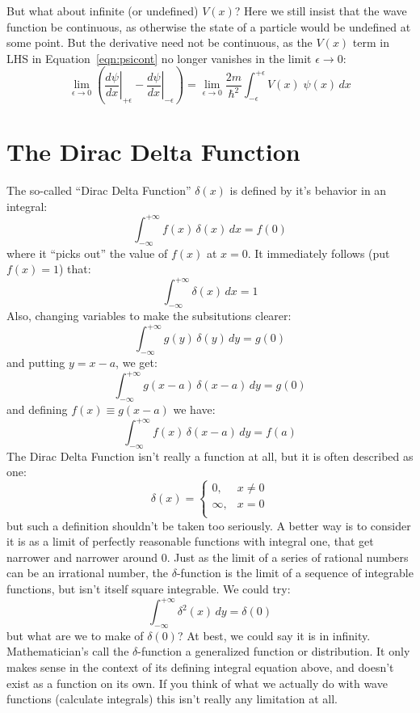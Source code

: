 \documentclass[12pt]{book}
\begin{document}
But what about infinite (or undefined) $V(x)$?  Here we still insist that the wave function be continuous, as otherwise the state of a particle would be undefined at some point.  But the derivative need not be continuous, as the $V(x)$ term in LHS in Equation~\ref{eqn:psicont} no longer vanishes in the limit $\epsilon \to 0$:
\begin{equation}
\label{eqn:psidiscont}
\lim_{\epsilon \to 0} \left( \left. \frac{d\psi}{d x} \right\rvert_{+\epsilon} 
- \left. \frac{d\psi}{d x} \right\rvert_{-\epsilon} \right) = 
\lim_{\epsilon \to 0}
\frac{2m}{\hbar^2}\int_{-\epsilon}^{+\epsilon} V(x) \; \psi(x) \, dx
\end{equation}

\section{The Dirac Delta Function}

The so-called ``Dirac Delta Function'' $\delta(x)$ is defined by it's behavior in an integral:
\begin{equation}
\int_{-\infty}^{+\infty} f(x) \, \delta(x) \, dx = f(0) 
\end{equation}
where it ``picks out'' the value of $f(x)$ at $x=0$.  It immediately follows (put $f(x)=1$) that:
\begin{equation}
\int_{-\infty}^{+\infty} \delta(x) \, dx = 1 
\end{equation}
Also, changing variables to make the subsitutions clearer:
$$\int_{-\infty}^{+\infty} g(y) \, \delta(y) \, dy = g(0)$$
and putting $y = x - a$, we get:
$$\int_{-\infty}^{+\infty} g(x-a) \, \delta(x-a) \, dy = g(0)$$
and defining $f(x) \equiv g(x-a)$ we have:
\begin{equation}
\int_{-\infty}^{+\infty} f(x) \, \delta(x-a) \, dy = f(a)
\end{equation}
The Dirac Delta Function isn't really a function at all, but it is often described as one:
$$\delta(x) = \begin{cases}
0, & x \neq 0 \\
\infty, & x=0 \\
\end{cases}
$$
but such a definition shouldn't be taken too seriously.  A better way is to consider it is as a limit of perfectly reasonable functions with integral one, that get narrower and narrower around 0.  Just as the limit of a series of rational numbers can be an irrational number, the $\delta$-function is the limit of a sequence of integrable functions, but isn't itself square integrable.  We could try:
\begin{equation*}
\int_{-\infty}^{+\infty} \delta^2(x) \, dy = \delta(0)
\end{equation*}
but what are we to make of $\delta(0)$? At best, we could say it is in infinity.  Mathematician's call the $\delta$-function a generalized function or distribution.  It only makes sense in the context of its defining integral equation above, and doesn't exist as a function on its own.  If you think of what we actually do with wave functions (calculate integrals) this isn't really any limitation at all.
\end{document}
